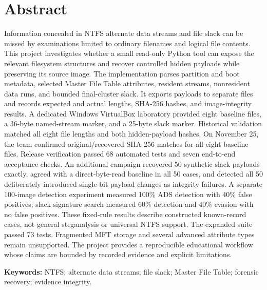 \documentclass[12pt,letterpaper]{report}
\begin{document}
\chapter*{Abstract}
Information concealed in NTFS alternate data streams and file slack can be
missed by examinations limited to ordinary filenames and logical file
contents. This project investigates whether a small read-only Python tool
can expose the relevant filesystem structures and recover controlled hidden
payloads while preserving its source image. The implementation parses
partition and boot metadata, selected Master File Table attributes, resident
streams, nonresident data runs, and bounded final-cluster slack. It exports
payloads to separate files and records expected and actual lengths, SHA-256
hashes, and image-integrity results. A dedicated Windows VirtualBox laboratory
provided eight baseline files, a 36-byte named-stream marker, and a 25-byte
slack marker. Historical validation matched all eight file lengths and both
hidden-payload hashes. On November 25, the team confirmed original/recovered
SHA-256 matches for all eight baseline files. Release verification passed 68 automated tests and seven
end-to-end acceptance checks. An additional campaign recovered 50 synthetic
slack payloads exactly, agreed with a direct-byte-read baseline in all 50
cases, and detected all 50 deliberately introduced single-bit payload changes
as integrity failures. A separate 100-image detection experiment measured
100\% ADS detection with 40\% false positives; slack signature search measured
60\% detection and 40\% evasion with no false positives. These fixed-rule
results describe constructed known-record cases, not general steganalysis
or universal NTFS support. The expanded suite passed 73 tests. Fragmented
MFT storage and several advanced attribute types remain
unsupported. The project provides a reproducible educational workflow whose
claims are bounded by recorded evidence and explicit limitations.

\vspace{1em}
\noindent\textbf{Keywords:} NTFS; alternate data streams; file slack;
Master File Table; forensic recovery; evidence integrity.
\tableofcontents
\listoffigures
\listoftables
\clearpage
{}







\clearpage

\appendix

\end{document}
